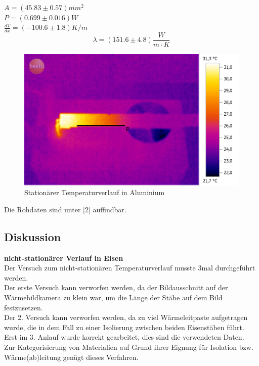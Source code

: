 \documentclass[12pt,a4paper]{article}
\begin{document}
\begin{multicols}{2}
\noindent $A=(45.83 \pm 0.57)mm^2$\\
$P=(0.699 \pm 0.016)W$\\
$\frac{dT}{dx}=(-100.6 \pm 1.8)K/m$\\
$$\lambda = ( 151.6 \pm 4.8)\frac{W}{m\cdot K}$$


\begin{figure}[H]
	\centering
	\includegraphics[scale=0.12]{./BilderCorrect/Versuch_1_stationaer_roh.png}
	\caption{Stationärer Temperaturverlauf in Aluminium}
	\label{fig:stat_verlauf}
\end{figure}






Die Rohdaten sind unter [2] auffindbar.

\subsection{Diskussion}



\noindent \textbf{nicht-stationärer Verlauf in Eisen}\\
Der Versuch zum nicht-stationären Temperaturverlauf musste 3mal durchgeführt werden.\\
Der erste Versuch kann verworfen werden, da der Bildausschnitt auf der Wärmebildkamera zu klein war, um die Länge der Stäbe auf dem Bild festzusetzen.\\
Der 2. Versuch kann verworfen werden, da zu viel Wärmeleitpaste aufgetragen wurde, die in dem Fall zu einer Isolierung zwischen beiden Eisenstäben führt.\\
Erst im 3. Anlauf wurde korrekt gearbeitet, dies sind die verwendeten Daten.\\
Zur Kategorisierung von Materialien auf Grund ihrer Eignung für Isolation bzw. Wärme(ab)leitung genügt dieses Verfahren.\\


\end{multicols}
\end{document}
